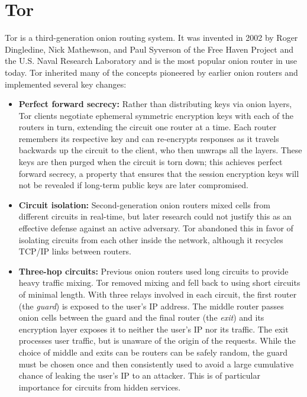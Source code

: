 \newpage

\section{Tor}

Tor is a third-generation onion routing system. It was invented in 2002 by Roger Dingledine, Nick Mathewson, and Paul Syverson of the Free Haven Project and the U.S. Naval Research Laboratory\cite{dingledine2004tor} and is the most popular onion router in use today. Tor inherited many of the concepts pioneered by earlier onion routers and implemented several key changes:\cite{syverson2011peel}\cite{dingledine2004tor}

\begin{itemize}
	\item \textbf{Perfect forward secrecy:} Rather than distributing keys via onion layers, Tor clients negotiate ephemeral symmetric encryption keys with each of the routers in turn, extending the circuit one router at a time. Each router remembers its respective key and can re-encrypts responses as it travels backwards up the circuit to the client, who then unwraps all the layers. These keys are then purged when the circuit is torn down; this achieves perfect forward secrecy, a property that ensures that the session encryption keys will not be revealed if long-term public keys are later compromised.
	\item \textbf{Circuit isolation:} Second-generation onion routers mixed cells from different circuits in real-time, but later research could not justify this as an effective defense against an active adversary\cite{syverson2011peel}. Tor abandoned this in favor of isolating circuits from each other inside the network, although it recycles TCP/IP links between routers.
	\item \textbf{Three-hop circuits:} Previous onion routers used long circuits to provide heavy traffic mixing. Tor removed mixing and fell back to using short circuits of minimal length. With three relays involved in each circuit, the first router (the \emph{guard}) is exposed to the user's IP address. The middle router passes onion cells between the guard and the final router (the \emph{exit}) and its encryption layer exposes it to neither the user's IP nor its traffic. The exit processes user traffic, but is unaware of the origin of the requests. While the choice of middle and exits can be routers can be safely random, the guard must be chosen once and then consistently used to avoid a large cumulative chance of leaking the user's IP to an attacker. This is of particular importance for circuits from hidden services\cite{overlier2006locating}\cite{bauer2007low}.

\end{itemize}
